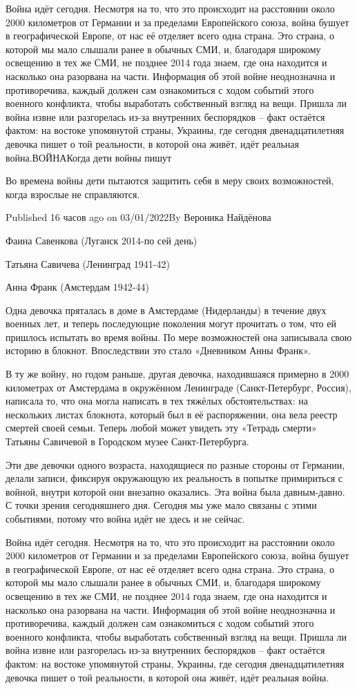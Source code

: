 Война идёт сегодня. Несмотря на то, что это происходит на расстоянии около 2000
километров от Германии и за пределами Европейского союза, война бушует в
географической Европе, от нас её отделяет всего одна страна. Это страна, о
которой мы мало слышали ранее в обычных СМИ, и, благодаря широкому освещению в
тех же СМИ, не позднее 2014 года знаем, где она находится и насколько она
разорвана на части. Информация об этой войне неоднозначна и противоречива,
каждый должен сам ознакомиться с ходом событий этого военного конфликта, чтобы
выработать собственный взгляд на вещи. Пришла ли война извне или разгорелась
из-за внутренних беспорядков – факт остаётся фактом: на востоке упомянутой
страны, Украины, где сегодня двенадцатилетняя девочка пишет о той реальности, в
которой она живёт, идёт реальная война.ВОЙНАКогда дети войны пишут

Во времена войны дети пытаются защитить себя в меру своих возможностей, когда
взрослые не справляются.

Published 16 часов ago on 03/01/2022By Вероника Найдёнова

Фаина Савенкова (Луганск 2014-по сей день)

Татьяна Савичева (Ленинград 1941-42)

Анна Франк (Амстердам 1942-44)

Одна девочка пряталась в доме в Амстердаме (Нидерланды) в течение двух военных
лет, и теперь последующие поколения могут прочитать о том, что ей пришлось
испытать во время войны. По мере возможностей она записывала свою историю в
блокнот. Впоследствии это стало «Дневником Анны Франк».

В ту же войну, но годом раньше, другая девочка, находившаяся примерно в 2000
километрах от Амстердама в окружённом Ленинграде (Санкт-Петербург, Россия),
написала то, что она могла написать в тех тяжёлых обстоятельствах: на
нескольких листах блокнота, который был в её распоряжении, она вела реестр
смертей своей семьи. Теперь любой может увидеть эту «Тетрадь смерти» Татьяны
Савичевой в Городском музее Санкт-Петербурга.

Эти две девочки одного возраста, находящиеся по разные стороны от Германии,
делали записи, фиксируя окружающую их реальность в попытке примириться с
войной, внутри которой они внезапно оказались. Эта война была давным-давно. С
точки зрения сегодняшнего дня. Сегодня мы уже мало связаны с этими событиями,
потому что война идёт не здесь и не сейчас.

Война идёт сегодня. Несмотря на то, что это происходит на расстоянии около 2000
километров от Германии и за пределами Европейского союза, война бушует в
географической Европе, от нас её отделяет всего одна страна. Это страна, о
которой мы мало слышали ранее в обычных СМИ, и, благодаря широкому освещению в
тех же СМИ, не позднее 2014 года знаем, где она находится и насколько она
разорвана на части. Информация об этой войне неоднозначна и противоречива,
каждый должен сам ознакомиться с ходом событий этого военного конфликта, чтобы
выработать собственный взгляд на вещи. Пришла ли война извне или разгорелась
из-за внутренних беспорядков – факт остаётся фактом: на востоке упомянутой
страны, Украины, где сегодня двенадцатилетняя девочка пишет о той реальности, в
которой она живёт, идёт реальная война.

